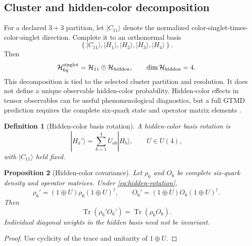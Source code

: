 \documentclass[11pt]{article}
\newtheorem{definition}{Definition}[section]
\newtheorem{proposition}[definition]{Proposition}
\newcommand{\Tr}{\operatorname{Tr}}
\newcommand{\Hil}{\mathcal H}
\begin{document}
\subsection{Cluster and hidden-color decomposition}

For a declared \(3+3\) partition, let \(|C_{11}\rangle\) denote the normalized color-singlet-times-color-singlet direction.  Complete it to an orthonormal basis
\begin{equation}
 \left\{
 |C_{11}\rangle,
 |H_1\rangle,
 |H_2\rangle,
 |H_3\rangle,
 |H_4\rangle
 \right\}.
\label{eq:hidden-basis}
\end{equation}
Then
\begin{equation}
 \Hil_{6q}^{\rm singlet}
 =\Hil_{11}\oplus\Hil_{\rm hidden},
 \qquad
 \dim\Hil_{\rm hidden}=4.
\label{eq:hidden-decomposition}
\end{equation}
This decomposition is tied to the selected cluster partition and resolution.  It does not define a unique observable hidden-color probability.  Hidden-color effects in tensor observables can be useful phenomenological diagnostics, but a full GTMD prediction requires the complete six-quark state and operator matrix elements \cite{Miller2014,MillerHiddenColor2014}.

\begin{definition}[Hidden-color basis rotation]
A hidden-color basis rotation is
\begin{equation}
 |H_a'\rangle
 =\sum_{b=1}^{4}U_{ab}|H_b\rangle,
 \qquad U\in U(4),
\label{eq:hidden-rotation}
\end{equation}
with \(|C_{11}\rangle\) held fixed.
\end{definition}

\begin{proposition}[Hidden-color covariance]
Let \(\rho_6\) and \(O_6\) be complete six-quark density and operator matrices.  Under \cref{eq:hidden-rotation},
\begin{equation}
 \rho_6'=(1\oplus U)\rho_6(1\oplus U)^\dagger,
 \qquad
 O_6'=(1\oplus U)O_6(1\oplus U)^\dagger.
\label{eq:hidden-covariance}
\end{equation}
Then
\begin{equation}
 \Tr(\rho_6'O_6')=\Tr(\rho_6O_6).
\label{eq:hidden-invariant-observable}
\end{equation}
Individual diagonal weights in the hidden basis need not be invariant.
\end{proposition}

\begin{proof}
Use cyclicity of the trace and unitarity of \(1\oplus U\).
\end{proof}
\end{document}
